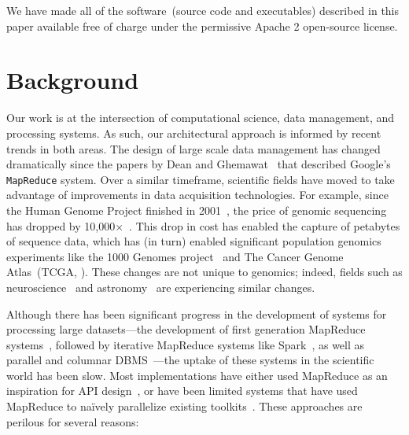 \documentclass[10pt]{report} %
\begin{document}
We have made all of the software~(source code and executables) described in this paper available free
of charge under the permissive Apache 2 open-source license.

\section{Background}
\label{sec:background}

Our work is at the intersection of computational science, data management, and processing
systems. As such, our architectural approach is informed by recent trends in both areas. The design of
large scale data management has changed dramatically since the papers by Dean and
Ghemawat~\cite{dean04, dean08} that described Google's \texttt{MapReduce} system. Over a
similar timeframe, scientific fields have moved to take advantage of improvements in data acquisition
technologies. For example, since the Human Genome Project finished in 2001~\cite{lander01}, the price
of genomic sequencing has dropped by 10,000$\times$~\cite{nhgri}. This drop in cost has enabled the
capture of petabytes of sequence data, which has (in turn) enabled significant population genomics
experiments like the 1000 Genomes project~\cite{siva08} and The Cancer Genome Atlas~(TCGA,
\cite{weinstein13}). These changes are not unique to genomics; indeed, fields such as
neuroscience~\cite{cunningham14} and astronomy~\cite{lsst2008, turk11, sdss2000} are experiencing similar
changes.

Although there has been significant progress in the development of systems for processing large
datasets---the development of first generation MapReduce systems~\cite{dean04}, followed by
iterative MapReduce systems like Spark~\cite{zaharia10}, as well as parallel and columnar
DBMS~\cite{abadi06, lamb12}---the uptake of these systems in the scientific world has been slow.
Most implementations have either used MapReduce as an inspiration for API
design~\cite{mckenna10}, or have been limited systems that have used MapReduce to na\"{i}vely
parallelize existing toolkits~\cite{langmead09, schatz09}. These approaches are perilous for several
reasons:
\end{document}
